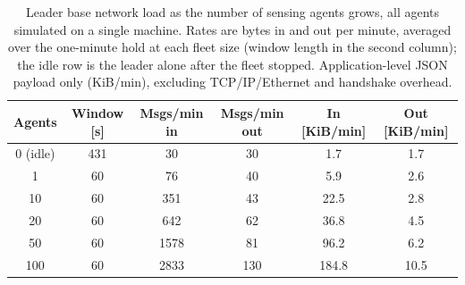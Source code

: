 \begin{table}[H]
\centering
\caption{Leader base network load as the number of sensing agents grows, all agents
simulated on a single machine. Rates are bytes in and out per minute, averaged over
the one-minute hold at each fleet size (window length in the second column); the
idle row is the leader alone after the fleet stopped. Application-level JSON payload
only (KiB/min), excluding TCP/IP/Ethernet and handshake overhead.}
\label{tab:net_load}
\begin{tabular}{cccccc}
\toprule
\textbf{Agents} & \textbf{Window [s]} & \textbf{Msgs/min in} & \textbf{Msgs/min out} & \textbf{In [KiB/min]} & \textbf{Out [KiB/min]} \\
\midrule
0 (idle) & 431 & 30 & 30 & 1.7 & 1.7 \\
1 & 60 & 76 & 40 & 5.9 & 2.6 \\
10 & 60 & 351 & 43 & 22.5 & 2.8 \\
20 & 60 & 642 & 62 & 36.8 & 4.5 \\
50 & 60 & 1578 & 81 & 96.2 & 6.2 \\
100 & 60 & 2833 & 130 & 184.8 & 10.5 \\
\bottomrule
\end{tabular}
\end{table}
